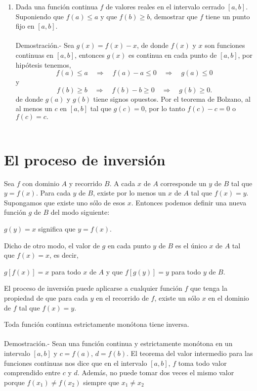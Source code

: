 \begin{enumerate}[\bfseries 1.]
    \item Dada una función continua $f$ de valores reales en el intervalo cerrado $[a,b]$. Suponiendo que $f(a)\leq a$ y que $f(b)\geq b$, demostrar que $f$ tiene un punto fijo en $[a,b]$.\\\\
	Demostración.-\;  Sea $g(x)=f(x)-x$, de donde $f(x)$ y $x$ son funciones continuas en $[a,b]$, entonces $g(x)$ es continua en cada punto de $[a,b]$, por hipótesis tenemos,
	$$f(a)\leq a \quad \Rightarrow \quad f(a)-a\leq 0 \quad \Rightarrow \quad g(a)\leq 0$$
	y
	$$f(b)\geq b \quad \Rightarrow \quad f(b)-b\geq 0 \quad \Rightarrow \quad g(b)\geq 0.$$
	de donde $g(a)$ y $g(b)$ tiene signos opuestos. Por el teorema de Bolzano, al al menos un $c$ en $[a,b]$ tal que $g(c)=0$, por lo tanto $f(c)-c=0$ o $f(c)=c.$\\\\

\end{enumerate}

\section{El proceso de inversión}

\begin{tcolorbox}
    \begin{def.}
	Sea $f$ con dominio $A$ y recorrido $B$. A cada $x$ de $A$ corresponde un $y$ de $B$ tal que $y=f(x)$. Para cada $y$ de $B$, existe por lo menos un $x$ de $A$ tal que $f(x)=y.$ Supongamos que existe uno sólo de esos $x$. Entonces podemos definir una nueva función $g$ de $B$ del modo siguiente:
	\begin{center}
	    $g(y)=x$ significa que $y=f(x).$
	\end{center}
	Dicho de otro modo, el valor de $g$ en cada punto $y$ de $B$ es el único $x$ de $A$ tal que $f(x)=x$, es decir,
	\begin{center}
	    $g[f(x)]=x$ para todo $x$ de $A$ y que $f[g(y)]=y$ para todo $y$ de $B$.
	\end{center}
	El proceso de inversión puede aplicarse a cualquier función $f$ que tenga la propiedad de que para cada $y$ en el recorrido de $f$, existe un sólo $x$ en el dominio de $f$ tal que $f(x)=y$.
    \end{def.}
\end{tcolorbox}

\begin{lema}
    Toda función continua estrictamente monótona tiene inversa.\\\\
	Demostración.-\; Sean una función continua y estrictamente monótona en un intervalo $[a,b]$ y $c=f(a)$, $d=f(b)$. El teorema del valor intermedio para las funciones continuas nos dice que en el intervalo $[a,b]$, $f$ toma todo valor comprendido entre $c$ y $d$. Además, no puede tomar dos veces el mismo valor porque $f(x_1)\neq f(x_2)$ siempre que $x_1\neq x_2$
\end{lema}


